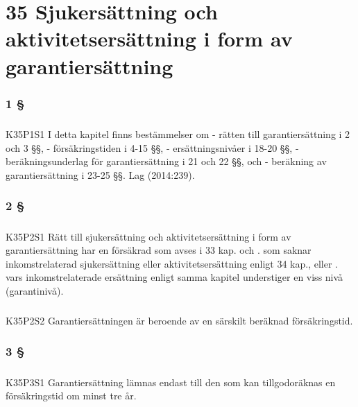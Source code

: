 \documentclass[a4paper,notitlepage,openany,10pt]{book}
\begin{document}
\chapter*{35 Sjukersättning och aktivitetsersättning i form av garantiersättning}
\subsection*{1 §}
\paragraph*{}
{\tiny K35P1S1}
I detta kapitel finns bestämmelser om
\newline - rätten till garantiersättning i 2 och 3 §§,
\newline - försäkringstiden i 4-15 §§,
\newline - ersättningsnivåer i 18-20 §§,
\newline - beräkningsunderlag för garantiersättning i 21 och 22 §§, och
\newline - beräkning av garantiersättning i 23-25 §§.
Lag (2014:239).
\subsection*{2 §}
\paragraph*{}
{\tiny K35P2S1}
Rätt till sjukersättning och aktivitetsersättning i form av garantiersättning har en försäkrad som avses i 33 kap. och
. som saknar inkomstrelaterad sjukersättning eller aktivitetsersättning enligt 34 kap., eller
. vars inkomstrelaterade ersättning enligt samma kapitel understiger en viss nivå (garantinivå).
\paragraph*{}
{\tiny K35P2S2}
Garantiersättningen är beroende av en särskilt beräknad försäkringstid.
\subsection*{3 §}
\paragraph*{}
{\tiny K35P3S1}
Garantiersättning lämnas endast till den som kan tillgodoräknas en försäkringstid om minst tre år.
\end{document}
